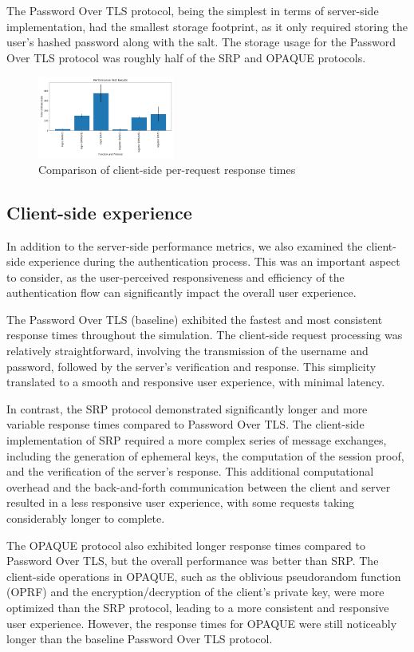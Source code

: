 The Password Over TLS protocol, being the simplest in terms of server-side implementation, had the smallest storage footprint, as it only required storing the user's hashed password along with the salt. The storage usage for the Password Over TLS protocol was roughly half of the SRP and OPAQUE protocols.

\begin{figure}[ht]
  \centering
  \includegraphics[width=0.4\textwidth]{./images/performance_test.png}
  \caption{Comparison of client-side per-request response times}
  \label{fig:performance_test}
\end{figure}

\subsection{Client-side experience}

In addition to the server-side performance metrics, we also examined the client-side experience during the authentication process. This was an important aspect to consider, as the user-perceived responsiveness and efficiency of the authentication flow can significantly impact the overall user experience.

The Password Over TLS (baseline) exhibited the fastest and most consistent response times throughout the simulation. The client-side request processing was relatively straightforward, involving the transmission of the username and password, followed by the server's verification and response. This simplicity translated to a smooth and responsive user experience, with minimal latency.

In contrast, the SRP protocol demonstrated significantly longer and more variable response times compared to Password Over TLS. The client-side implementation of SRP required a more complex series of message exchanges, including the generation of ephemeral keys, the computation of the session proof, and the verification of the server's response. This additional computational overhead and the back-and-forth communication between the client and server resulted in a less responsive user experience, with some requests taking considerably longer to complete.

The OPAQUE protocol also exhibited longer response times compared to Password Over TLS, but the overall performance was better than SRP. The client-side operations in OPAQUE, such as the oblivious pseudorandom function (OPRF) and the encryption/decryption of the client's private key, were more optimized than the SRP protocol, leading to a more consistent and responsive user experience. However, the response times for OPAQUE were still noticeably longer than the baseline Password Over TLS protocol.